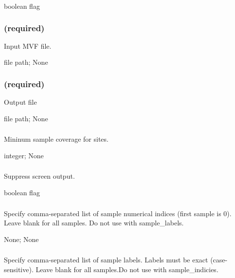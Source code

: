 \documentclass[letterpaper,11pt,english]{sphinxmanual}
\begin{document}
 boolean flag


\subsubsection{ (required)}
\label{\detokenize{prog_desc:id70}}
 Input MVF file.

 file path;  None


\subsubsection{ (required)}
\label{\detokenize{prog_desc:id71}}
 Output file

 file path;  None


\subsubsection{}
\label{\detokenize{prog_desc:id72}}
 Mininum sample coverage for sites.

 integer;  None


\subsubsection{}
\label{\detokenize{prog_desc:id73}}
 Suppress screen output.

 boolean flag


\subsubsection{}
\label{\detokenize{prog_desc:id74}}
 Specify comma-separated list of sample numerical indices (first sample is 0). Leave blank for all samples. Do not use with \textendash{}sample\_labels.

 None;  None


\subsubsection{}
\label{\detokenize{prog_desc:id75}}
 Specify comma-separated list of sample labels. Labels must be exact (case-sensitive). Leave blank for all samples.Do not use with \textendash{}sample\_indicies.
\end{document}
